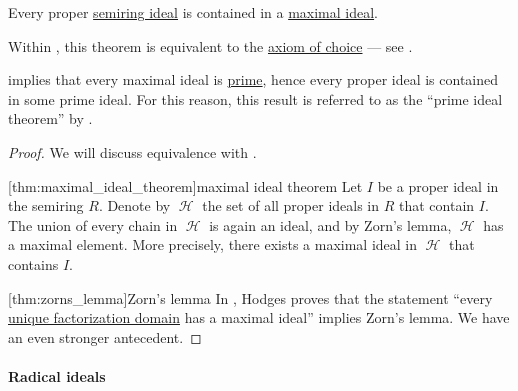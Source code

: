 \begin{theorem}\label{thm:maximal_ideal_theorem}
  Every proper \hyperref[def:semiring_ideal]{semiring ideal} is contained in a \hyperref[def:semiring_ideal/maximal]{maximal ideal}.
\end{theorem}
\begin{comments}
  \item Within \hyperref[def:zfc]{}, this theorem is equivalent to the \hyperref[def:zfc/choice]{axiom of choice} --- see .

  \item {} implies that every maximal ideal is \hyperref[def:semiring_ideal/prime]{prime}, hence every proper ideal is contained in some prime ideal. For this reason, this result is referred to as the \enquote{prime ideal theorem} by .
\end{comments}
\begin{proof}
  We will discuss equivalence with .

  [thm:maximal_ideal_theorem]{maximal ideal theorem} Let \( I \) be a proper ideal in the semiring \( R \). Denote by \( \mscrH \) the set of all proper ideals in \( R \) that contain \( I \). The union of every chain in \( \mscrH \) is again an ideal, and by Zorn's lemma, \( \mscrH \) has a maximal element. More precisely, there exists a maximal ideal in \( \mscrH \) that contains \( I \).

  [thm:zorns_lemma]{Zorn's lemma} In \cite{Hodges1979}, Hodges proves that the statement \enquote{every \hyperref[def:unique_factorization_domain]{unique factorization domain} has a maximal ideal} implies Zorn's lemma. We have an even stronger antecedent.
\end{proof}

\paragraph{Radical ideals}

